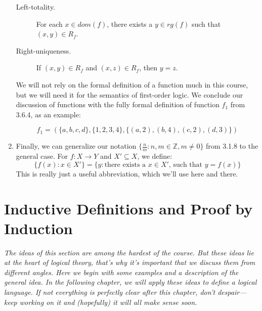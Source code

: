 \begin{enumerate}[\thesection.1]
\begin{description}
		\item[Left-totality.] For each $x\in dom(f)$, there exists a $y\in rg(f)$ such that $(x,y)\in R_f$.
	
		\item[Right-uniqueness.] If $(x,y)\in R_f$ and $(x,z)\in R_f$, then $y=z$.
	
	\end{description}
	
	We will not rely on the formal definition of a function much in this course, but we will need it for the semantics of first-order logic. We conclude our discussion of functions with the fully formal definition of function $f_1$ from 3.6.4, as an example:
	
	\[f_1=(\{a,b,c,d\}, \{1,2,3,4\}, \{(a,2), (b,4), (c,2), (d,3)\})\]
	
	\item Finally, we can generalize our notation $\{\frac{n}{m}:n,m\in \mathbb{Z}, m\neq 0\}$ from 3.1.8 to the general case. For $f:X\to Y$ and $X'\subseteq X$, we define: \[\{f(x):x\in X'\}=\{y:\text{there exists a }x\in X'\text{, such that }y=f(x)\}\] This is really just a useful abbreviation, which we'll use here and there.
	 
\end{enumerate}

\section{Inductive Definitions and Proof by Induction}

\emph{The ideas of this section are among the hardest of the course. But these ideas lie at the heart of logical theory, that's why it's important that we discuss them from different angles. Here we begin with some examples and a description of the general idea. In the following chapter, we will apply these ideas to define a logical language. If not everything is perfectly clear after this chapter, don't despair---keep working on it and (hopefully) it will all make sense soon.}

